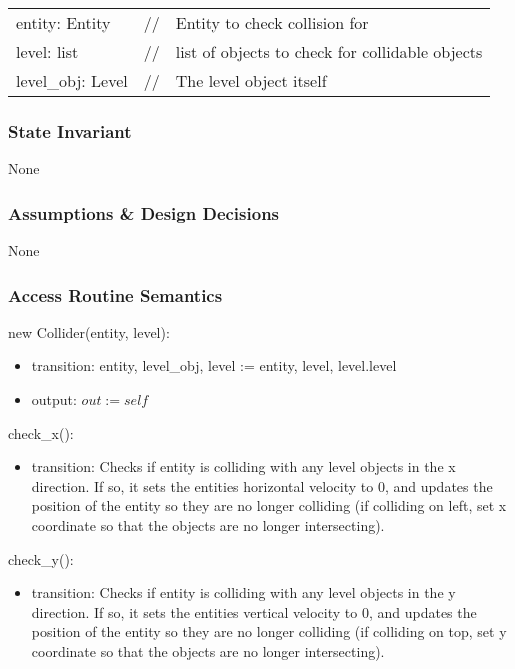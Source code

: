 \documentclass[12pt]{article}
\begin{document}
\begin{tabular}{lll}
    entity: Entity & // & Entity to check collision for \\
    level: list & // & list of objects to check for collidable objects \\
    level\_obj: Level & // & The level object itself
\end{tabular}

\subsubsection* {State Invariant}

None

\subsubsection* {Assumptions \& Design Decisions}

None

\subsubsection* {Access Routine Semantics}

new Collider(entity, level):
\begin{itemize}
    \item transition: entity, level\_obj, level := entity, level, level.level
    \item output: $out := self$
\end{itemize}

check\_x():
\begin{itemize}
    \item transition: Checks if entity is colliding with any level objects in the x direction. If so, it sets the entities horizontal velocity to 0, and updates the position of the entity so they are no longer colliding (if colliding on left, set x coordinate so that the objects are no longer intersecting).
\end{itemize}

check\_y():
\begin{itemize}
    \item transition: Checks if entity is colliding with any level objects in the y direction. If so, it sets the entities vertical velocity to 0, and updates the position of the entity so they are no longer colliding (if colliding on top, set y coordinate so that the objects are no longer intersecting).
\end{itemize}
\end{document}
